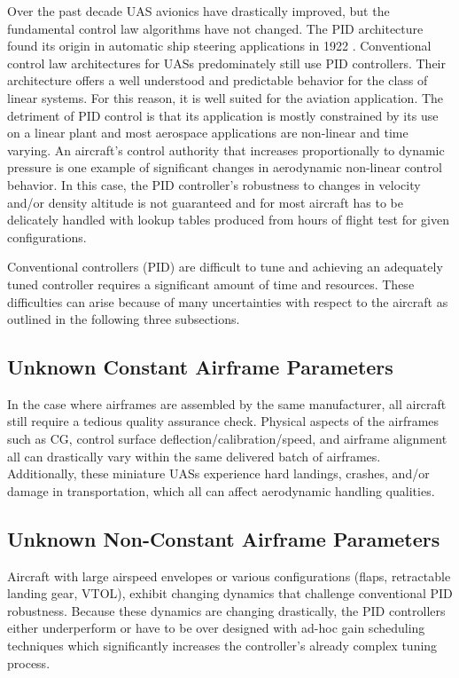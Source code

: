 Over the past decade \ac{UAS} avionics have drastically improved, but the fundamental control law algorithms have not changed.  The \ac{PID} architecture found its origin in automatic ship steering applications in 1922 \cite{minorsky1922pid}.  Conventional control law architectures for \ac{UAS}s predominately still use \ac{PID} controllers.  Their architecture offers a well understood and predictable behavior for the class of linear systems.  For this reason, it is well suited for the aviation application.  The detriment of \ac{PID} control is that its application is mostly constrained by its use on a linear plant and most aerospace applications are non-linear and time varying.   An aircraft's control authority that increases proportionally to dynamic pressure is one example of significant changes in aerodynamic non-linear control behavior.  In this case, the \ac{PID} controller's robustness to changes in velocity and/or density altitude is not guaranteed and for most aircraft has to be delicately handled with lookup tables produced from hours of flight test for given configurations.

Conventional controllers (\ac{PID}) are difficult to tune and achieving an adequately tuned controller requires a significant amount of time and resources.  These difficulties can arise because of many uncertainties with respect to the aircraft as outlined in the following three subsections.

\subsection{Unknown Constant Airframe Parameters}
In the case where airframes are assembled by the same manufacturer, all aircraft still require a tedious quality assurance check.  Physical aspects of the airframes such as \ac{CG}, control surface deflection/calibration/speed, and airframe alignment all can drastically vary within the same delivered batch of airframes.  Additionally, these miniature \ac{UAS}s experience hard landings, crashes, and/or damage in transportation, which all can affect aerodynamic handling qualities.

\subsection{Unknown Non-Constant Airframe Parameters}
Aircraft with large airspeed envelopes or various configurations (flaps, retractable landing gear, \ac{VTOL}), exhibit changing dynamics that challenge conventional \ac{PID} robustness.  Because these dynamics are changing drastically, the \ac{PID} controllers either underperform or have to be over designed with ad-hoc gain scheduling techniques which significantly increases the controller's already complex tuning process.  

